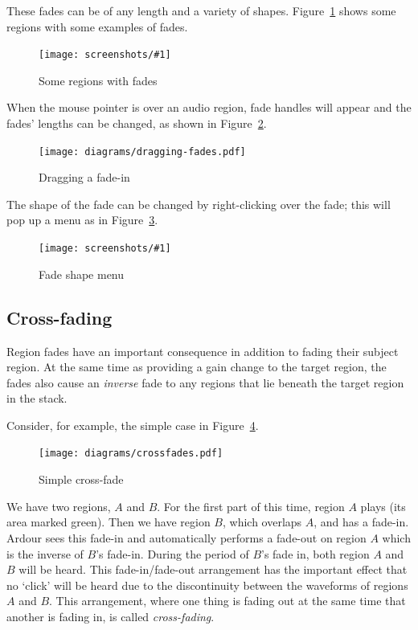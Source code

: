 \documentclass[10pt,a4paper]{book}
\newcommand{\screenshot}[3]{%
\begin{figure}[ht]%
\begin{center}
\texttt{[image: screenshots/\#1]}
\end{center}
\caption{#2}
\label{#3}
\end{figure}}
\begin{document}
{These fades can be of any length and a variety of shapes.
Figure~\ref{fig:region-fades} shows some regions with some examples of fades.

\screenshot{region-fades.png}{Some regions with fades}{fig:region-fades}

When the mouse pointer is over an audio region, fade handles will
appear and the fades' lengths can be changed, as shown in
Figure~\ref{fig:dragging-fades}.

\begin{figure}[ht]
\begin{center}
\texttt{[image: diagrams/dragging-fades.pdf]}
\end{center}
\caption{Dragging a fade-in}
\label{fig:dragging-fades}
\end{figure}

The shape of the fade can be changed by right-clicking over the fade;
this will pop up a menu as in Figure~\ref{fig:fades-menu}.

\screenshot{fades-menu.png}{Fade shape menu}{fig:fades-menu}


\subsection{Cross-fading}

Region fades have an important consequence in addition to fading their
subject region.  At the same time as providing a gain change to the
target region, the fades also cause an \emph{inverse} fade to any
regions that lie beneath the target region in the stack.

Consider, for example, the simple case in Figure~\ref{fig:crossfades}.

\begin{figure}[ht]
\begin{center}
\texttt{[image: diagrams/crossfades.pdf]}
\end{center}
\caption{Simple cross-fade}
\label{fig:crossfades}
\end{figure}

We have two regions, $A$ and $B$.  For the first part of this time,
region $A$ plays (its area marked green).  Then we have region $B$,
which overlaps $A$, and has a fade-in.  Ardour sees this fade-in and
automatically performs a fade-out on region $A$ which is the inverse
of $B$'s fade-in.  During the period of $B$'s fade in, both region $A$
and $B$ will be heard.  This fade-in/fade-out arrangement has the
important effect that no `click' will be heard due to the
discontinuity between the waveforms of regions $A$ and $B$.  This
arrangement, where one thing is fading out at the same time that
another is fading in, is called \emph{cross-fading}.

}
\end{document}
